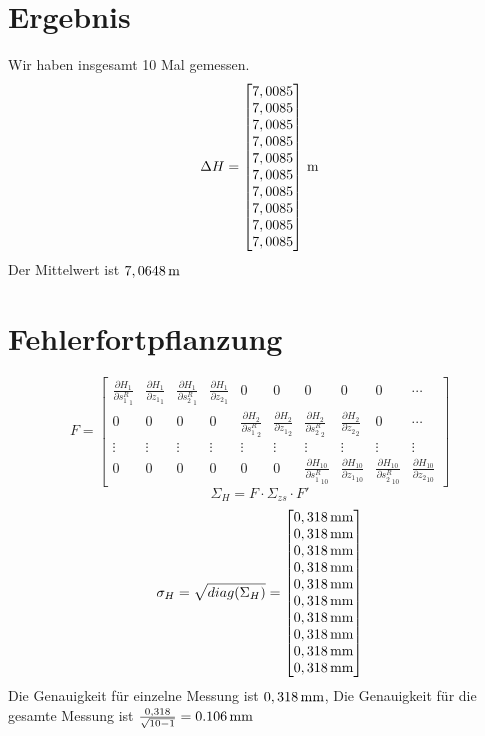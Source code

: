 \section{Ergebnis}
Wir haben insgesamt 10 Mal gemessen.
\begin{equation*}
	\Delta H = \begin{bmatrix}
	7,0085\\
	7,0085\\
	7,0085\\
	7,0085\\
	7,0085\\
	7,0085\\
	7,0085\\
	7,0085\\
	7,0085\\
	7,0085
	\end{bmatrix} \,\mathrm{m}
\end{equation*}
Der Mittelwert ist $7,0648 \,\mathrm{m}$
\section{Fehlerfortpflanzung}
\begin{equation*}
	F = \begin{bmatrix}
	\frac{\partial H_1}{\partial {s^R_1}_1} & \frac{\partial H_1}{\partial {z_1}_1} & \frac{\partial H_1}{\partial {s^R_2}_1} & \frac{\partial H_1}{\partial {z_2}_1} & 0 & 0 & 0 & 0 & 0 & \cdots \\
	0 & 0 & 0 & 0 & \frac{\partial H_2}{\partial {s^R_1}_2} & \frac{\partial H_2}{\partial {z_1}_2} & \frac{\partial H_2}{\partial {s^R_2}_2} & \frac{\partial H_2}{\partial {z_2}_2} & 0 & \cdots \\
	\vdots & \vdots & \vdots & \vdots & \vdots & \vdots & \vdots & \vdots & \vdots & \vdots \\
	0 & 0 & 0 & 0 & 0 & 0 & \frac{\partial H_{10}}{\partial {s^R_1}_{10}} & \frac{\partial H_{10}}{\partial {z_1}_{10}} & \frac{\partial H_{10}}{\partial {s^R_2}_{10}} & \frac{\partial H_{10}}{\partial {z_2}_{10}}
	\end{bmatrix}
\end{equation*}
\begin{equation*}
	\Sigma_H = F \cdot \Sigma_{zs} \cdot F'
\end{equation*}
\begin{equation*}
	\sigma_H = \sqrt{diag(\Sigma_H)} = \begin{bmatrix}
	0,318 \,\mathrm{mm} \\
	0,318 \,\mathrm{mm} \\
	0,318 \,\mathrm{mm} \\
	0,318 \,\mathrm{mm} \\
	0,318 \,\mathrm{mm} \\
	0,318 \,\mathrm{mm} \\
	0,318 \,\mathrm{mm} \\
	0,318 \,\mathrm{mm} \\
	0,318 \,\mathrm{mm} \\
	0,318 \,\mathrm{mm} 
	\end{bmatrix} 
\end{equation*}
Die Genauigkeit für einzelne Messung ist $0,318 \,\mathrm{mm}$, Die Genauigkeit für die gesamte Messung ist $\frac{0,318}{\sqrt{10-1}} = 0.106 \,\mathrm{mm}$

